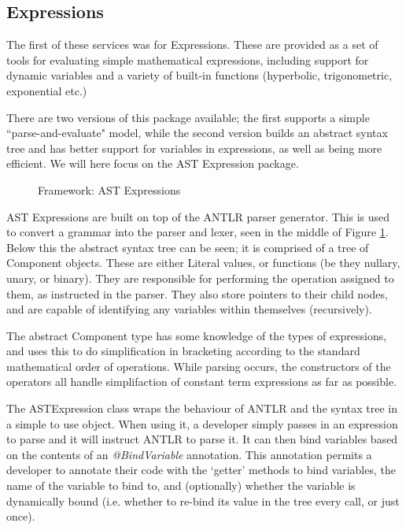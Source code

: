 \documentclass{acm_proc_article-sp}
\begin{document}
\subsection{Expressions}
{
The first of these services was for Expressions. These are provided as a set of tools for evaluating simple mathematical expressions, including support for dynamic variables and a variety of built-in functions (hyperbolic, trigonometric, exponential etc.)

There are two versions of this package available; the first supports a simple ``parse-and-evaluate" model, while the second version builds an abstract syntax tree and has better support for variables in expressions, as well as being more efficient. We will here focus on the AST Expression package.

\begin{figure}[t]
\centering
{}
\caption{Framework: AST Expressions}
\label{fig:framework:ast}
\end{figure}
AST Expressions are built on top of the ANTLR parser generator. This is used to convert a grammar into the parser and lexer, seen in the middle of Figure \ref{fig:framework:ast}. Below this the abstract syntax tree can be seen; it is comprised of a tree of Component objects. These are either Literal values, or functions (be they nullary, unary, or binary). They are responsible for performing the operation assigned to them, as instructed in the parser. They also store pointers to their child nodes, and are capable of identifying any variables within themselves (recursively).

The abstract Component type has some knowledge of the types of expressions, and uses this to do simplification in bracketing according to the standard mathematical order of operations. While parsing occurs, the constructors of the operators all handle simplifaction of constant term expressions as far as possible.

The ASTExpression class wraps the behaviour of ANTLR and the syntax tree in a simple to use object. When using it, a developer simply passes in an expression to parse and it will instruct ANTLR to parse it. It can then bind variables based on the contents of an {\textit{@BindVariable}} annotation. This annotation permits a developer to annotate their code with the `getter' methods to bind variables, the name of the variable to bind to, and (optionally) whether the variable is dynamically bound (i.e. whether to re{}-bind its value in the tree every call, or just once).

}
\end{document}
